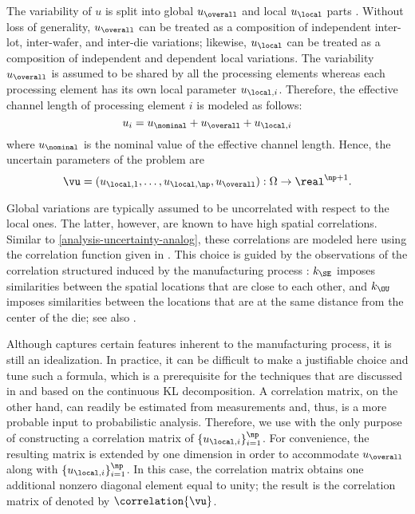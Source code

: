 The variability of $u$ is split into global $u_\overall$ and local $u_\local$
parts \cite{shen2009, chandra2010}. Without loss of generality, $u_\overall$ can
be treated as a composition of independent inter-lot, inter-wafer, and inter-die
variations; likewise, $u_\local$ can be treated as a composition of independent
and dependent local variations. The variability $u_\overall$ is assumed to be
shared by all the \np processing elements whereas each processing element has
its own local parameter $u_{\local, i}$. Therefore, the effective channel length
of processing element $i$ is modeled as follows:
\[
  u_i = u_\nominal + u_\overall + u_{\local, i}
\]
where $u_\nominal$ is the nominal value of the effective channel length. Hence,
the uncertain parameters of the problem are
\[
  \vu = (u_{\local, 1}, \dotsc, u_{\local, \np}, u_\overall): \Omega \to \real^{\np + 1}.
\]

Global variations are typically assumed to be uncorrelated with respect to the
local ones. The latter, however, are known to have high spatial correlations.
Similar to \cref{analysis-uncertainty-analog}, these correlations are modeled
here using the correlation function given in . This
choice is guided by the observations of the correlation structured induced by
the manufacturing process \cite{friedberg2005, chandrakasan2000, cheng2011}:
$k_\SE$ imposes similarities between the spatial locations that are close to
each other, and $k_\OU$ imposes similarities between the locations that are at
the same distance from the center of the die; see also \cite{ghanem1991,
ghanta2006, bhardwaj2008, huang2009a, lee2013}.

Although  captures certain features inherent to the
manufacturing process, it is still an idealization. In practice, it can be
difficult to make a justifiable choice and tune such a formula, which is a
prerequisite for the techniques that are discussed in  and
based on the continuous \ac{KL} decomposition. A correlation matrix, on the
other hand, can readily be estimated from measurements and, thus, is a more
probable input to probabilistic analysis. Therefore, we use
 with the only purpose of constructing a correlation
matrix of $\{ u_{\local, i} \}_{i = 1}^\np$. For convenience, the resulting
matrix is extended by one dimension in order to accommodate $u_\overall$ along
with $\{ u_{\local, i} \}_{i = 1}^\np$. In this case, the correlation matrix
obtains one additional nonzero diagonal element equal to unity; the result is
the correlation matrix of \vu denoted by $\correlation{\vu}$.


